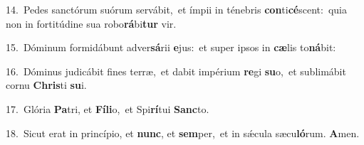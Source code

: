 {\numbfont\textcolor{\numbcolor}{14.}}~Pedes sanctórum suórum servábit,~\dagger et ímpii in ténebris \textbf{con}\-ti\-\textbf{cé}\-scent:~\star quia non in fortitúdine sua robo\-\textbf{rá}\-bi\textbf{tur} vir.\par
{\numbfont\textcolor{\numbcolor}{15.}}~Dóminum formidábunt adver\-\textbf{sá}\-rii \textbf{e}\-jus:~\star et super ipsos in \textbf{cæ}\-lis to\-\textbf{ná}\-bit:\par
{\numbfont\textcolor{\numbcolor}{16.}}~Dóminus judicábit fines terræ,~\dagger et dabit impérium \textbf{re}\-gi \textbf{su}\-o,~\star et sublimábit cornu \textbf{Chris}\-ti \textbf{su}\-i.\par
{\numbfont\textcolor{\numbcolor}{17.}}~Glória \textbf{Pa}\-tri, et \textbf{Fí}\-\textbf{li}o,~\star et Spi\-\textbf{rí}\-tui \textbf{Sanc}\-to.\par
{\numbfont\textcolor{\numbcolor}{18.}}~Sicut erat in princípio, et \textbf{nunc}\-, et \textbf{sem}\-per,~\star et in sǽcula sæcu\-\textbf{ló}\-rum. \textbf{A}\-men.\par
